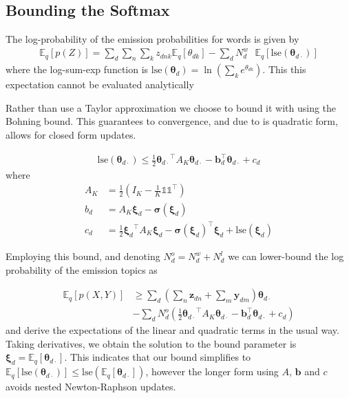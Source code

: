 \documentclass{sciposter}
\newcommand \ex[2] {
    \mathbb{E}_{ { #2 } }\left[ #1 \right]
}
\newcommand \halve[1] {
	\frac{#1}{2}
}
\newcommand \half {
    \halve{1}
}
\newcommand \T { ^\top }
\newcommand \vv[1] { \bm #1 }
\newcommand \Ed {{ \vv{\xi}_d}}
\newcommand \zdnk[0] { { z_{dnk} } }
\newcommand \thd[0]  { { \vv \theta_d } }
\newcommand \thdk[0] { { \theta_{dk} } }
\newcommand \one  {{  \mathds{1} }}
\newcommand \lse { \text{lse} }
\newcommand \thdo { { \vv{\theta}_{d\cdot} } }
\begin{document}
\begin{multicols}{3}
\section{Bounding the Softmax}
The log-probability of the emission probabilities for words is given by
\begin{align*}
\ex{p(Z)}{q} = \sum_d \sum_n \sum_k \zdnk \ex{\thdk}{q} - \sum_d N^w_d \text{ }\ex{\lse(\thdo)}{q}
\end{align*}
where the log-sum-exp function is $\lse(\thd) = \ln (\sum_k e^\thdk)$. This this expectation cannot be evaluated analytically

Rather than use a Taylor approximation\cite{Wang2013} we choose to bound it with using the Bohning bound\cite{Bohning1988}. This guarantees to convergence, and due to is quadratic form, allows for closed form updates.

\begin{align*}
\lse(\thdo) \leq \half \thdo\T A_K \thdo - \vv{b}_d\T\thdo + c_d \label{eqn:lse-def}
\end{align*}
where
\begin{align*}
A_K & = \half \left( I_K - \frac{1}{K} \one \one\T \right) \\
b_d & = A_K \Ed - \vv{\sigma}(\Ed)  \\
c_d & = \frac{1}{2} \Ed\T A_K \Ed - \vv{\sigma}(\Ed)\T\Ed + \lse(\Ed)
\end{align*}

Employing this bound, and denoting $N^o_d = N^w_d + N^l_d$ we can lower-bound the log probability of the emission topics as

\begin{equation*}
\begin{aligned}
\ex{p(X,Y)}{q} & \geq \sum_d  (\sum_n \vv{z}_{dn} + \sum_m \vv{y}_{dm}) \thdo \\
   & - \sum_d N^o_d \left(\half \thdo\T A_K \thdo - \vv{b}_d\T\thdo + c_d\right)
\end{aligned}
\end{equation*}
and derive the expectations of the linear and quadratic terms in the usual way.\\

Taking derivatives, we obtain the solution to the bound parameter is $\Ed = \ex{\thdo}{q}$. This indicates that our bound simplifies to $\ex{\lse(\thdo)}{q} \leq \lse(\ex{\thdo}{q})$, however the longer form using $A$, $\vv{b}$ and $c$ avoids nested Newton-Raphson updates.\\


\end{multicols}
\end{document}
